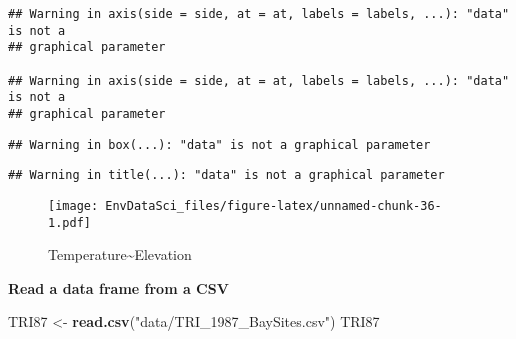 \documentclass[
]{book}
\newenvironment{Shaded}{\begin{snugshade}}{\end{snugshade}}
\newcommand{\KeywordTok}[1]{\textcolor[rgb]{0.13,0.29,0.53}{\textbf{#1}}}
\newcommand{\NormalTok}[1]{#1}
\newcommand{\StringTok}[1]{\textcolor[rgb]{0.31,0.60,0.02}{#1}}
\begin{document}
\begin{verbatim}
## Warning in axis(side = side, at = at, labels = labels, ...): "data" is not a
## graphical parameter

## Warning in axis(side = side, at = at, labels = labels, ...): "data" is not a
## graphical parameter
\end{verbatim}

\begin{verbatim}
## Warning in box(...): "data" is not a graphical parameter
\end{verbatim}

\begin{verbatim}
## Warning in title(...): "data" is not a graphical parameter
\end{verbatim}

\begin{figure}
\centering
\texttt{[image: EnvDataSci\_files/figure-latex/unnamed-chunk-36-1.pdf]}
\caption{\label{fig:unnamed-chunk-36}Temperature\textasciitilde Elevation}
\end{figure}

\textbf{Read a data frame from a CSV}

\begin{Shaded}
\begin{Highlighting}[]
\NormalTok{TRI87 <-}\StringTok{ }\KeywordTok{read.csv}\NormalTok{(}\StringTok{"data/TRI_1987_BaySites.csv"}\NormalTok{)}
\NormalTok{TRI87}
\end{Highlighting}
\end{Shaded}
\end{document}
